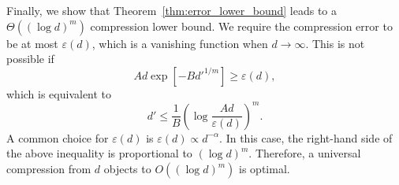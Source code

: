 \documentclass{article}
\theoremstyle{plain}
\newtheorem{assumption}{Assumption}
\newenvironment{REV*}
  {\begingroup\color[HTML]{000000}}
  {\endgroup}
\begin{document}
\begin{REV*}
Finally, we show that Theorem~\ref{thm:error_lower_bound} leads to a $\Theta((\log d)^m)$ compression lower bound. We require the compression error to be at most $\varepsilon(d)$, which is a vanishing function when $d\to\infty$. This is not possible if
\begin{equation}
    A d \exp[-B d'^{1/m}] \geq \varepsilon(d)    ,
\end{equation}
which is equivalent to
\begin{equation}
    d' \leq \frac{1}{B} \left( \log\frac{Ad}{\varepsilon(d)} \right)^m   .
\end{equation}
A common choice for $\varepsilon(d)$ is $\varepsilon(d) \propto d^{-\alpha}$. In this case, the right-hand side of the above inequality is proportional to $(\log d)^m$. Therefore, a universal compression from $d$ objects to $O((\log d)^m)$ is optimal. 





\end{REV*}
\end{document}
